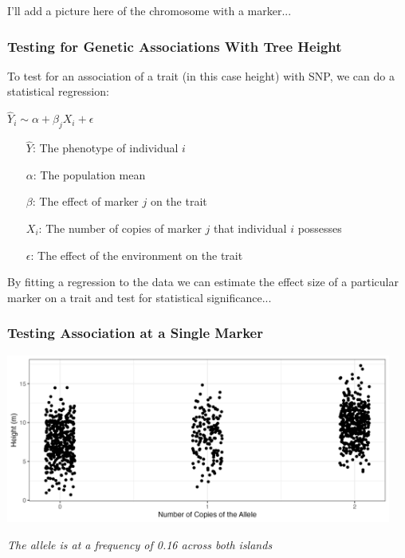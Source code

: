 \documentclass[xcolor=dvipsnames]{beamer}
\begin{document}
 
 \begin{frame}
 
 I'll add a picture here of the chromosome with a marker...
 
 \end{frame}
 

\begin{frame}
\frametitle{Testing for Genetic Associations With Tree Height}

To test for an association of a trait (in this case height) with SNP, we can do a statistical regression:

\vspace{15pt}
\Large \centering $\hat{Y}_i \sim \alpha  + \beta_j X_i + \epsilon$ \pause
\vspace{15pt}
\normalsize 
\begin{itemize}

	\item[$\hat{Y}$:] The phenotype of individual $i$
	\item[$\alpha$:] The population mean
	\item[$\beta$:] The effect of marker $j$ on the trait 
	\item[$X_i$:] The number of copies of marker $j$ that individual $i$ possesses
	\item[$\epsilon$:] The effect of the environment on the trait
	
\end{itemize} 

\vspace{15pt}
	
By fitting a regression to the data we can estimate the effect size of a particular marker on a trait and test for statistical significance...

\end{frame}

\begin{frame}
\frametitle{Testing Association at a Single Marker}
	
	\includegraphics[keepaspectratio, width  = 0.95\textwidth]{img/snp_mod_noLine}				
	
\textit{	The allele is at a frequency of 0.16 across both islands}
\end{frame}
\end{document}
